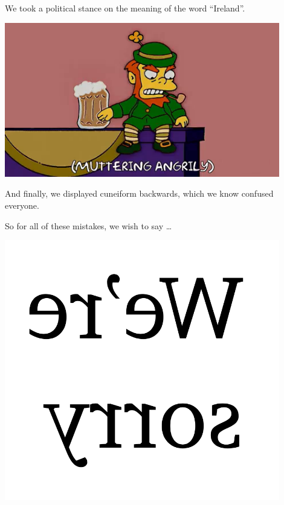 \documentclass[11pt]{beamer}
\begin{document}
\begin{frame}{}
\medskip{}
We took a political stance on the meaning of the word ``Ireland''.
\begin{center}
\includegraphics[max width=0.9\textwidth,max height=0.5\textheight
]{Images/ireland.png}
\end{center}
\end{frame}
\begin{frame}{}
\medskip{}
And finally, we displayed cuneiform backwards, which we know confused everyone.
\end{frame}
\begin{frame}
So for all of these mistakes, we wish to say \ldots{}
\pause{}
\begin{center}
\includegraphics[max width=0.9\textwidth,max height=0.5\textheight
    ]{Images/cuneiform.png}
\end{center}

\end{frame}
\endgroup{}
\end{document}

